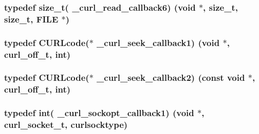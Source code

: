 \subsubsection[{\texorpdfstring{\+\_\+curl\+\_\+read\+\_\+callback6}{_curl_read_callback6}}]{\setlength{\rightskip}{0pt plus 5cm}typedef size\+\_\+t( \+\_\+curl\+\_\+read\+\_\+callback6) (void $\ast$, size\+\_\+t, size\+\_\+t, F\+I\+LE $\ast$)}\hypertarget{typecheck-gcc_8h_a7cac2f82ccf5a3dcb04f60d865119cce}{}\label{typecheck-gcc_8h_a7cac2f82ccf5a3dcb04f60d865119cce}
\subsubsection[{\texorpdfstring{\+\_\+curl\+\_\+seek\+\_\+callback1}{_curl_seek_callback1}}]{\setlength{\rightskip}{0pt plus 5cm}typedef {\bf C\+U\+R\+Lcode}($\ast$ \+\_\+curl\+\_\+seek\+\_\+callback1) (void $\ast$, {\bf curl\+\_\+off\+\_\+t}, int)}\hypertarget{typecheck-gcc_8h_adebe91c0cf6ae015cc98752e4fe2c363}{}\label{typecheck-gcc_8h_adebe91c0cf6ae015cc98752e4fe2c363}
\subsubsection[{\texorpdfstring{\+\_\+curl\+\_\+seek\+\_\+callback2}{_curl_seek_callback2}}]{\setlength{\rightskip}{0pt plus 5cm}typedef {\bf C\+U\+R\+Lcode}($\ast$ \+\_\+curl\+\_\+seek\+\_\+callback2) (const void $\ast$, {\bf curl\+\_\+off\+\_\+t}, int)}\hypertarget{typecheck-gcc_8h_a704fb61f39b18a5fde22c82d59b60865}{}\label{typecheck-gcc_8h_a704fb61f39b18a5fde22c82d59b60865}
\subsubsection[{\texorpdfstring{\+\_\+curl\+\_\+sockopt\+\_\+callback1}{_curl_sockopt_callback1}}]{\setlength{\rightskip}{0pt plus 5cm}typedef int( \+\_\+curl\+\_\+sockopt\+\_\+callback1) (void $\ast$, {\bf curl\+\_\+socket\+\_\+t}, {\bf curlsocktype})}\hypertarget{typecheck-gcc_8h_a32154ca77f61d2dec71eecd83f9416ca}{}\label{typecheck-gcc_8h_a32154ca77f61d2dec71eecd83f9416ca}
